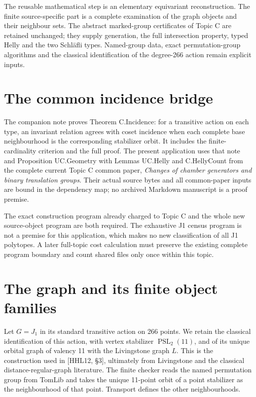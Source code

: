 The reusable mathematical step is an elementary equivariant
reconstruction. The finite source-specific part is a complete
examination of the graph objects and their neighbour sets. The abstract
marked-group certificates of Topic C are retained unchanged; they
supply generation, the full intersection property, typed Helly and the
two Schläfli types. Named-group data, exact permutation-group algorithms
and the classical identification of the degree-266 action remain
explicit inputs.

\section{The common incidence bridge}
The companion note proves Theorem C.Incidence: for a transitive action on each type, an invariant relation agrees with coset incidence when each complete base neighbourhood is the corresponding stabilizer orbit. It includes the finite-cardinality criterion and the full proof. The present application uses that note and Proposition UC.Geometry with Lemmas UC.Helly and C.HellyCount from the complete current Topic C common paper, \emph{Changes of chamber generators and binary translation groups}. Their actual source bytes and all common-paper inputs are bound in the dependency map; no archived Markdown manuscript is a proof premise.

The exact construction program already charged to Topic C and the whole new source-object program are both required. The exhaustive J1 census program is not a premise for this application, which makes no new classification of all J1 polytopes. A later full-topic cost calculation must preserve the existing complete program boundary and count shared files only once within this topic.

\section{The graph and its finite object families}\label{the-graph-and-its-finite-object-families}

Let \(G=J_1\) in its standard transitive action on 266 points. We retain
the classical identification of this action, with vertex stabilizer
\(\operatorname{PSL}_2(11)\), and of its unique orbital graph of valency
11 with the Livingstone graph \(L\). This is the construction used in
{[}HHL12, §3{]}, ultimately from Livingstone and the classical
distance-regular-graph literature. The finite checker reads the named
permutation group from TomLib and takes the unique 11-point orbit of a
point stabilizer as the neighbourhood of that point. Transport defines
the other neighbourhoods.

